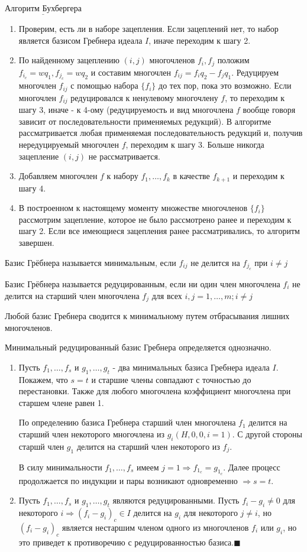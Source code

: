 $\underline{\text{Алгоритм Бухбергера}}$
\begin{enumerate}
	\item Проверим, есть ли в наборе зацепления. Если зацеплений нет, то набор является базисом Гребнера идеала $I$, иначе переходим к шагу 2.
	\item По найденному зацеплению $(i,j)$ многочленов $f_i,f_j$ положим $f_{i_c} = wq_1, f_{j_c} = wq_2$ и составим многочлен $f_{ij} = f_iq_2 - f_jq_1$. Редуцируем многочлен $f_{ij}$ с помощью набора $\{f_i\}$ до тех пор, пока это возможно. Если многочлен $f_{ij}$ редуцировался к ненулевому многочлену $f$, то переходим к шагу 3, иначе - к 4-ому (редуцируемость и вид многочлена $f$ вообще говоря зависит от последовательности применяемых редукций). В алгоритме рассматривается любая применяемая последовательность редукций и, получив нередуцируемый многочлен $f$, переходим к шагу 3. Больше никогда зацепление $(i,j)$ не рассматривается. 
	\item Добавляем многочлен $f$ к набору $f_1,\ldots,f_k$ в качестве $f_{k+1}$ и переходим к шагу 4.
	\item В построенном к настоящему моменту множестве многочленов $\{f_i\}$ рассмотрим зацепление, которое не было рассмотрено ранее и переходим к шагу 2. Если все имеющиеся зацепления ранее рассматривались, то алгоритм завершен.
\end{enumerate}

\opr Базис Грёбнера называется минимальным, если $f_{ij}$ не делится на $f_{j_c}$ при $i \neq j$

\opr Базис Грёбнера называется редуцированным, если ни один член многочлена $f_i$ не делится на старший член многочлена $f_j$ для всех $i,j = 1,\ldots,m; i \neq j$

\note Любой базис Гребнера сводится к минимальному путем отбрасывания лишних многочленов.

\thr Минимальный редуцированный базис Гребнера определяется однозначно.

\proof

\begin{enumerate}
	\item Пусть $f_1,\ldots,f_s$ и $g_1,\ldots,g_t$ - два минимальных базиса Гребнера идеала $I$. Покажем, что $s = t$ и старшие члены совпадают с точностью до перестановки. Также для любого многочлена коэффициент многочлена при старшем члене равен 1.
	
	По определению базиса Гребнера старший член многочлена $f_1$ делится на старший член некоторого многочлена из $g_i (H,0,0, i = 1)$. С другой стороны старшй член $g_1$ делится на старший член некоторого из $f_j$. 
	
	В силу минимальности $f_1, \ldots, f_s$ имеем $j=1 \Rightarrow f_{1_c} = g_{1_c}$. Далее процесс продолжается по индукции и пары возникают одновременно $\Rightarrow s = t$.
	\item Пусть $f_1,\ldots,f_s$ и $g_1,\ldots,g_t$ являются редуцированными. Пусть $f_i - g_i \neq 0$ для некоторого $i \Rightarrow (f_i - g_i)_c \in I$ делится на $g_i$ для некоторого $j \neq i$, но $(f_i - g_i)_c$ является нестаршим членом одного из многочленов $f_i$ или $g_i$, но это приведет к противоречию с редуцированностью базиса.$\blacksquare$
\end{enumerate}
